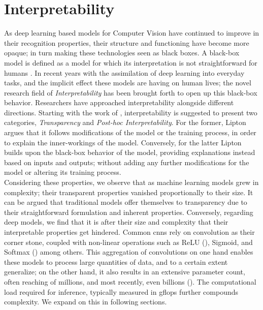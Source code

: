 \section{Interpretability}
\label{rel:sec_int}
As deep learning based models for Computer Vision have continued to improve in their recognition 
properties, their structure and functioning have become more opaque; in turn making these 
technologies seen as black boxes. A black-box model is defined as a model for which its 
interpretation is not straightforward for humans \autocite{petch2022opening}. In recent years 
with the assimilation of deep learning into everyday tasks, and the implicit effect these models 
are having on human lives; the novel research field of \emph{Interpretability} has been brought 
forth to open up this black-box behavior. Researchers have approached interpretability alongside 
different directions. Starting with the work of \cite{li2018deep}, interpretability is suggested 
to present two categories, \emph{Transparency} and \emph{Post-hoc Interpretability}.
For the former, Lipton argues that it follows modifications of the model or the training process, 
in order to explain the inner-workings of the model. Conversely, for the latter Lipton builds upon 
the black-box behavior of the model, providing explanations instead based on inputs and outputs; 
without adding any further modifications for the model or altering its training process.\\

\noindent Considering these properties, we observe that as machine learning models grew in 
complexity; their transparent properties vanished proportionally to their size. It can be argued 
that traditional models offer themselves to  transparency due to their straightforward formulation 
and inherent properties. Conversely, regarding deep models, we find that it is after their size and 
complexity that their interpretable properties get hindered. Common  \glspl{cnn} 
rely on convolution as their corner stone, coupled with non-linear operations such as 
ReLU (\cite{fukushima1975cognitron}), Sigmoid, and Softmax (\cite{hopfield1985neural}) among others.
This aggregation of convolutions on one hand enables these models to process large quantities of 
data, and to a certain extent generalize; on the other hand, it also results in an extensive 
parameter count, often reaching of millions, and most recently, even billions (\cite{openai_compute}). 
The computational load required for inference, typically measured in \gls{gflops} further compounds 
complexity. We expand on this in following sections.\\

